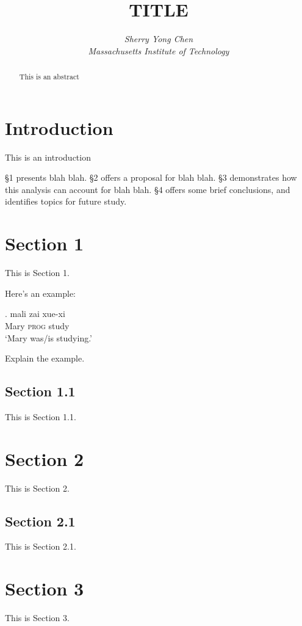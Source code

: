\documentclass[letterpaper,12pt]{article}
\title{\large \textbf{TITLE}}
\author{\textit{Sherry Yong Chen}\\
\textit{Massachusetts Institute of Technology}}
\date{}
\begin{document}
\maketitle

\thispagestyle{empty}
\pagestyle{empty}


\begin{abstract}
\noindent This is an abstract
\end{abstract}

\section*{Introduction}
This is an introduction 

\parencite{RefWorks:192}

\S 1 presents blah blah.
\S 2 offers a  proposal for blah blah.
\S 3 demonstrates how this analysis can account for blah blah.
\S 4 offers some brief conclusions, and identifies topics for future study.

\section{Section 1}
This is Section 1.

Here's an example:

\exg. mali     zai       xue-xi \\
		Mary   \textsc{prog} study \\
		`Mary was/is studying.'

Explain the example.

\subsection{Section 1.1}
This is Section 1.1.

\section{Section 2}
This is Section 2.

\subsection{Section 2.1}
This is Section 2.1.

\section{Section 3}
This is Section 3.
\end{document}
